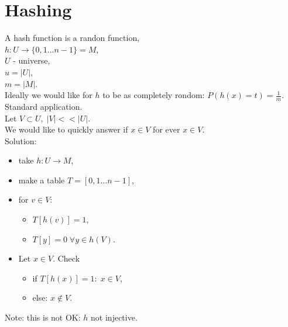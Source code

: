 \documentclass[a4paper, 12pt]{book}
\theoremstyle{definition}
\theoremstyle{remark}
\begin{document}
\chapter{Hashing}


A hash function is a randon function, \\
$h: U \to \{0, 1 \dots n-1\} = M$, \\
$U$ - universe, \\
$u = |U|$, \\
$m = |M|$. \\
Ideally we would like for $h$ to be as completely rondom: $P(h(x) = t) = \frac{1}{m}$. \\
Standard application. \\
Let $V \subset U, \; |V| << |U|$. \\
We would like to quickly answer if $x \in V$ for ever $x \in V$. \\
Solution:
\begin{itemize}
  \item take $h: U \to M$,
  \item make a table $T = [0, 1 \dots n-1]$,
  \item for $v \in V$:
    \begin{itemize}[label={}]
      \item $T[h(v)] = 1$,
      \item $T[y] = 0 \; \forall y \in h(V)$.
    \end{itemize}
  \item Let $x \in V$. Check
    \begin{itemize}
      \item if $T[h(x)] = 1: \; x \in V$,
      \item else: $x \notin V$.
    \end{itemize}
\end{itemize}
Note: this is not OK: $h$ not injective.


\end{document}
